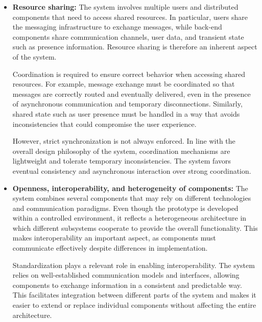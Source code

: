 \documentclass{scrartcl}
\begin{document}
\begin{itemize}
	Authentication is therefore a core requirement, and the system must verify the identity of users before granting access to its services. Basic authorization is also required to ensure that users can only send and receive messages that belong to them. Trust in the system is established through controlled access and by preventing unauthorized interactions between users.
	
	More advanced security mechanisms, such as sophisticated attack prevention or comprehensive access control policies, are outside the scope of the project. The focus is instead on the fundamental mechanisms that enable secure communication in a distributed environment.
	
	\item \textbf{Resource sharing:} The system involves multiple users and distributed components that need to access shared resources. In particular, users share the messaging infrastructure to exchange messages, while back-end components share communication channels, user data, and transient state such as presence information. Resource sharing is therefore an inherent aspect of the system.
	
	Coordination is required to ensure correct behavior when accessing shared resources. For example, message exchange must be coordinated so that messages are correctly routed and eventually delivered, even in the presence of asynchronous communication and temporary disconnections. Similarly, shared state such as user presence must be handled in a way that avoids inconsistencies that could compromise the user experience.
	
	However, strict synchronization is not always enforced. In line with the overall design philosophy of the system, coordination mechanisms are lightweight and tolerate temporary inconsistencies. The system favors eventual consistency and asynchronous interaction over strong coordination.
	
	\item \textbf{Openness, interoperability, and heterogeneity of components:} The system combines several components that may rely on different technologies and communication paradigms. Even though the prototype is developed within a controlled environment, it reflects a heterogeneous architecture in which different subsystems cooperate to provide the overall functionality. This makes interoperability an important aspect, as components must communicate effectively despite differences in implementation.
	
	Standardization plays a relevant role in enabling interoperability. The system relies on well-established communication models and interfaces, allowing components to exchange information in a consistent and predictable way. This facilitates integration between different parts of the system and makes it easier to extend or replace individual components without affecting the entire architecture.
	

\end{itemize}
\end{document}
